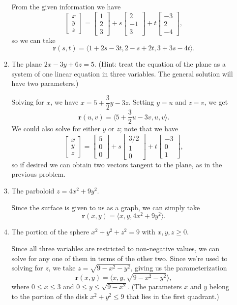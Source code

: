 \documentclass[12pt,letterpaper]{article}
\renewcommand{\r}{\mathbf{r}}
\newcommand{\bbm}{\begin{bmatrix}}
\newcommand{\ebm}{\end{bmatrix}}
\begin{document}
\begin{enumerate}
\begin{enumerate}
\bigskip

From the given information we have 
\[
\bbm x\\y\\z\ebm = \bbm 1\\2\\3\ebm + s\bbm 2\\-1\\3\ebm + t\bbm -3\\2\\-4\ebm,
\]
so we can take
\[
\r(s,t) = \langle 1+2s-3t, 2-s+2t, 3+3s-4t\rangle.
\]

 \item The plane $2x-3y+6z=5$. (Hint: treat the equation of the plane as a system of one linear equation in three variables. The general solution will have two parameters.)

\bigskip

Solving for $x$, we have $x = 5+\dfrac{3}{2}y-3z$. Setting $y=u$ and $z=v$, we get
\[
\r(u,v) = \langle 5+\frac{3}{2}u-3v, u, v\rangle.
\]
We could also solve for either $y$ or $z$; note that we have
\[
\bbm x\\y\\z\ebm = \bbm 5\\0\\0\ebm + s\bbm 3/2\\1\\0\ebm + t\bbm -3\\0\\1\ebm,
\]
so if desired we can obtain two vectors tangent to the plane, as in the previous problem.

 \item The parboloid $z=4x^2+9y^2$.

\bigskip

Since the surface is given to us as a graph, we can simply take
\[
\r(x,y) = \langle x, y, 4x^2+9y^2\rangle.
\]

 \item The portion of the sphere $x^2+y^2+z^2=9$ with $x,y,z\geq 0$.

\bigskip

Since all three variables are restricted to non-negative values, we can solve for any one of them in terms of the other two. Since we're used to solving for $z$, we take $z=\sqrt{9-x^2-y^2}$, giving us the parameterization
\[
\r(x,y) = \langle x, y, \sqrt{9-x^2-y^2}\rangle,
\]
where $0\leq x\leq 3$ and $0\leq y\leq \sqrt{9-x^2}$. (The parameters $x$ and $y$ belong to the portion of the disk $x^2+y^2\leq 9$ that lies in the first quadrant.)


\end{enumerate}
\end{enumerate}
\end{document}
